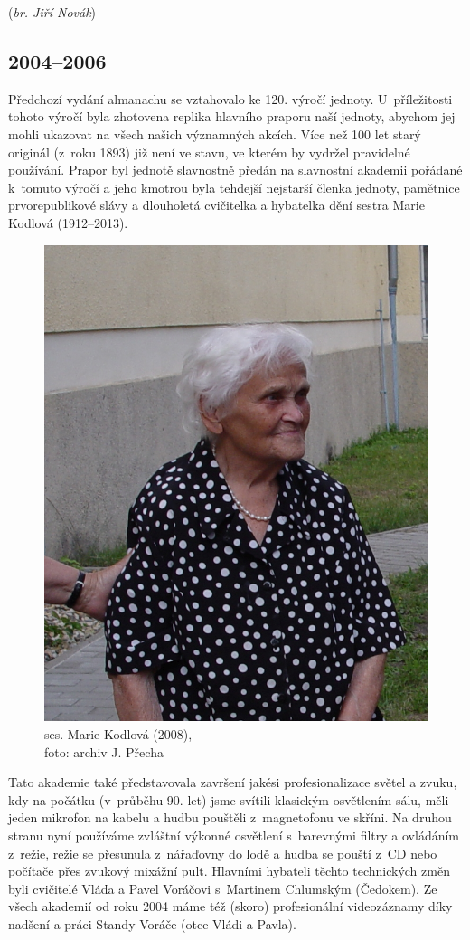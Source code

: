\documentclass[a5paper, 11pt, twoside]{article}
\begin{document}
\hfill(\textit{br. Jiří Novák})

\subsection{2004--2006}

Předchozí vydání almanachu se vztahovalo ke 120. výročí jednoty. U~příležitosti tohoto výročí byla zhotovena replika hlavního praporu naší
jednoty, abychom jej mohli ukazovat na všech našich významných akcích.
Více než 100 let starý originál (z~roku 1893) již není ve stavu, ve
kterém by vydržel pravidelné používání. Prapor byl jednotě slavnostně
předán na slavnostní akademii pořádané k~tomuto výročí a jeho kmotrou
byla tehdejší nejstarší členka jednoty, pamětnice prvorepublikové slávy
a dlouholetá cvičitelka a hybatelka dění sestra Marie Kodlová
(1912--2013). 
\begin{figure}
  \includegraphics[width=0.9\linewidth]{img/50_manka.jpg}
  \caption*{ses. Marie Kodlová (2008),\\foto: archiv J. Přecha}
\end{figure}
Tato akademie také představovala završení jakési profesionalizace světel a zvuku, kdy na počátku (v~průběhu 90. let) jsme
svítili klasickým osvětlením sálu, měli jeden mikrofon na kabelu a hudbu
pouštěli z~magnetofonu ve skříni. Na druhou stranu nyní používáme
zvláštní výkonné osvětlení s~barevnými filtry a ovládáním z~režie, režie
se přesunula z~nářaďovny do lodě a hudba se pouští z~CD nebo počítače
přes zvukový mixážní pult. Hlavními hybateli těchto technických změn
byli cvičitelé Vláďa a Pavel Voráčovi s~Martinem Chlumským (Čedokem). Ze
všech akademií od roku 2004 máme též (skoro) profesionální videozáznamy
díky nadšení a práci Standy Voráče (otce Vládi a Pavla).
\end{document}
